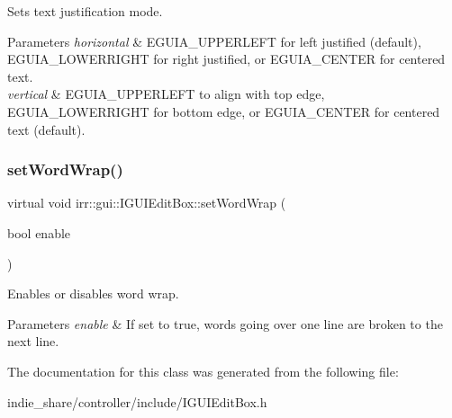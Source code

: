 Sets text justification mode. 


\begin{DoxyParams}{Parameters}
{\em horizontal} & E\+G\+U\+I\+A\+\_\+\+U\+P\+P\+E\+R\+L\+E\+FT for left justified (default), E\+G\+U\+I\+A\+\_\+\+L\+O\+W\+E\+R\+R\+I\+G\+HT for right justified, or E\+G\+U\+I\+A\+\_\+\+C\+E\+N\+T\+ER for centered text. \\
\hline
{\em vertical} & E\+G\+U\+I\+A\+\_\+\+U\+P\+P\+E\+R\+L\+E\+FT to align with top edge, E\+G\+U\+I\+A\+\_\+\+L\+O\+W\+E\+R\+R\+I\+G\+HT for bottom edge, or E\+G\+U\+I\+A\+\_\+\+C\+E\+N\+T\+ER for centered text (default). \\
\hline
\end{DoxyParams}
\mbox{\label{classirr_1_1gui_1_1IGUIEditBox_aa020a985b38d293794b73e6e12dafd7c}} 
\subsubsection{\texorpdfstring{set\+Word\+Wrap()}{setWordWrap()}}
{\footnotesize\ttfamily virtual void irr\+::gui\+::\+I\+G\+U\+I\+Edit\+Box\+::set\+Word\+Wrap (\begin{DoxyParamCaption}\item[{bool}]{enable }\end{DoxyParamCaption})\hspace{0.3cm}{\ttfamily [pure virtual]}}



Enables or disables word wrap. 


\begin{DoxyParams}{Parameters}
{\em enable} & If set to true, words going over one line are broken to the next line. \\
\hline
\end{DoxyParams}


The documentation for this class was generated from the following file\+:\begin{DoxyCompactItemize}
\item 
indie\+\_\+share/controller/include/I\+G\+U\+I\+Edit\+Box.\+h\end{DoxyCompactItemize}
